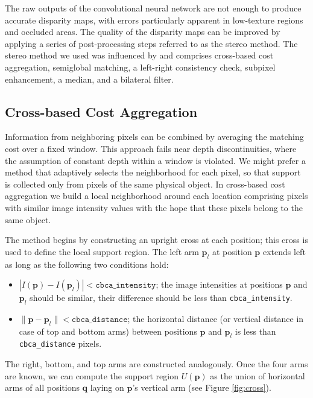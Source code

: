 \documentclass[twoside,11pt]{article}
\begin{document}
The raw outputs of the convolutional neural network are not enough to produce
accurate disparity maps, with errors particularly apparent in low-texture
regions and occluded areas. The quality of the disparity maps can be improved
by applying a series of post-processing steps referred to as the stereo method.
The stereo method we used was influenced by \citet{mei2011building} and
comprises cross-based cost aggregation, semiglobal matching, a left-right
consistency check, subpixel enhancement, a median, and a bilateral filter.

\subsection{Cross-based Cost Aggregation}

Information from neighboring pixels can be combined by averaging the matching
cost over a fixed window. This approach fails near depth discontinuities,
where the assumption of constant depth within a window is violated. We might
prefer a method that adaptively selects the neighborhood for each pixel, so
that support is collected only from pixels of the same physical object. In
cross-based cost aggregation \citep{zhang2009cross} we build a local
neighborhood around each location comprising pixels with similar image
intensity values with the hope that these pixels belong to the same object.

The method begins by constructing an upright cross at each position; this cross
is used to define the local support region. The left arm $\mathbf{p}_l$ at
position $\mathbf{p}$ extends left as long as the following two conditions
hold: 

\begin{itemize}

\item $|I(\mathbf{p}) - I(\mathbf{p}_l)| < \texttt{cbca\_intensity}$; the image
intensities at positions $\mathbf{p}$ and $\mathbf{p}_l$ should be similar,
their difference should be less than \texttt{cbca\_intensity}.

\item $\|\mathbf{p} - \mathbf{p}_l\| < \texttt{cbca\_distance}$; the horizontal
distance (or vertical distance in case of top and bottom arms) between positions
$\mathbf{p}$ and $\mathbf{p}_l$ is less than \texttt{cbca\_distance} pixels.

\end{itemize}
The right, bottom, and top arms are constructed analogously. Once the four arms
are known, we can compute the support region $U(\mathbf{p})$ as the union of
horizontal arms of all positions $\mathbf{q}$ laying on $\mathbf{p}$'s
vertical arm (see Figure \ref{fig:cross}).
\end{document}
